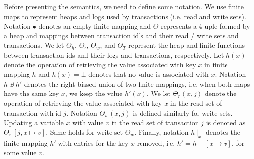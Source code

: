 \documentclass[sigplan, anonymous, review]{acmart}
\theoremstyle{definition}
\begin{document}

Before presenting the semantics, we need to define some notation.
We use finite maps to  represent heaps and logs used by transactions (i.e. read and write
sets). Notation $\bullet$ denotes an empty finite mapping and
$\Theta$ represents a 4-uple formed by a heap and mappings between transaction id's and their
read / write sets and transactions. We let $\Theta_h$, $\Theta_r$, $\Theta_w$, and $\Theta_T$ represent the heap and finite
functions between transaction ids and their logs and transactions,
respectively. Let $h(x)$ denote the operation
of retrieving the value associated with key $x$ in finite mapping 
$h$ and $h(x)=\bot$ denotes that no value is associated
with $x$. Notation $h \uplus h'$ denotes the right-biased union of 
two finite mappings, i.e. when both maps have the same key $x$, we keep
the value $h'(x)$. We let $\Theta_r(x,j)$ denote the operation of
retrieving the value associated with key $x$ in the read set of transaction
with id $j$. Notation $\Theta_w(x,j)$ is defined similarly for write sets. Updating
a variable $x$ with value $v$ in the read set of transaction $j$ is denoted as
$\Theta_r\,[j,x\mapsto v]$. Same holds for write set $\Theta_w$.
Finally, notation $h\mid_{x}$ denotes the finite mapping $h'$ with entries for the key $x$
removed, i.e. $h' = h - [ x \mapsto v]$, for some value $v$.
\end{document}
